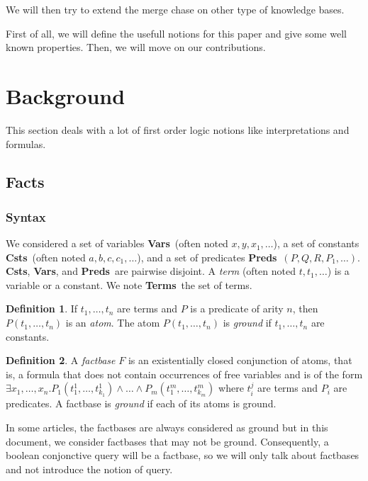 \documentclass{article}
\theoremstyle{definition}
\newtheorem{definition}{Definition}[section]
\theoremstyle{remark}
\newcommand{\Vars}{\textbf{Vars}}
\newcommand{\Terms}{\textbf{Terms}}
\newcommand{\Preds}{\textbf{Preds}}
\newcommand{\Csts}{\textbf{Csts}}
\begin{document}
We will then try to extend the merge chase on other type of knowledge bases.

\tableofcontents			

First of all, we will define the usefull notions for this paper and give some well known properties. Then, we will move on our contributions. 

\section{Background}

This section deals with a lot of first order logic notions like interpretations and formulas.

\subsection{Facts}

\subsubsection{Syntax}

We considered a set of variables \Vars\ (often noted $x,y,x_{1},\ldots$), a set of constants \Csts\ (often noted $a,b,c,c_{1},\ldots$), and a set of predicates \Preds\ $(P,Q,R,P_{1},\ldots)$. \Csts, \Vars, and \Preds\ are pairwise disjoint. A \emph{term}  (often noted $t,t_{1},\ldots$) is a variable or a constant. We note \Terms\ the set of terms.  

\begin{definition}
If $t_1,\ldots,t_n$ are terms and $P$ is a predicate of arity $n$, then $P(t_{1},\ldots,t_{n})$ is an \emph{atom}. The atom $P(t_{1},\ldots,t_{n})$ is \emph{ground} if $t_1,\ldots,t_n$ are constants.
\end{definition}

\begin{definition}
A \emph{factbase} $F$ is an existentially closed conjunction of atoms, that is, a formula that does not contain occurrences of free variables and is of the form $\exists x_{1},\ldots,x_{n}.P_{1}(t_{1}^{1},\ldots,t_{k_{1}}^{1})\land \ldots\land P_{m}(t_{1}^{m},\ldots,t_{k_{m}}^{m})$ where $t_i^j$ are terms and $P_i$ are predicates. A factbase is \emph{ground} if each of its atoms is ground.
\end{definition}

In some articles, the factbases are always considered as ground but in this document, we consider factbases that may not be ground. Consequently, a  boolean conjonctive query will be a factbase, so we will only talk about factbases and not introduce the notion of query.
\end{document}
